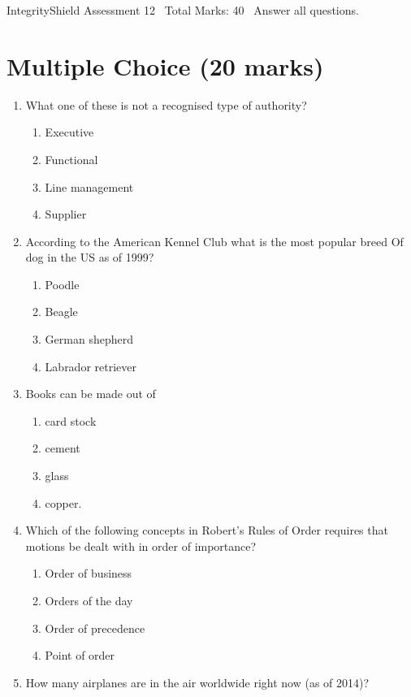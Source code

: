 \documentclass[12pt]{article}
\begin{document}
\begin{center}
IntegrityShield Assessment 12 \
Total Marks: 40 \
Answer all questions.
\end{center}

\section*{Multiple Choice (20 marks)}
\begin{enumerate}[label=\arabic*.]
\item What one of these is not a recognised type of authority?
\begin{enumerate}[label=(\alph*)]
    \item Executive
    \item Functional
    \item Line management
    \item Supplier
\end{enumerate}
\item According to the American Kennel Club what is the most popular breed Of dog in the US as of 1999?
\begin{enumerate}[label=(\alph*)]
    \item Poodle
    \item Beagle
    \item German shepherd
    \item Labrador retriever
\end{enumerate}
\item Books can be made out of
\begin{enumerate}[label=(\alph*)]
    \item card stock
    \item cement
    \item glass
    \item copper.
\end{enumerate}
\item Which of the following concepts in Robert's Rules of Order requires that motions be dealt with in order of importance?
\begin{enumerate}[label=(\alph*)]
    \item Order of business
    \item Orders of the day
    \item Order of precedence
    \item Point of order
\end{enumerate}
\item How many airplanes are in the air worldwide right now (as of 2014)?

\end{enumerate}
\end{document}
